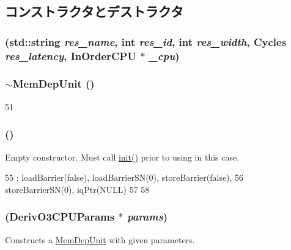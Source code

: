 \subsection{コンストラクタとデストラクタ}
\hypertarget{classMemDepUnit_a954662036e667fd17db64ae83226ff3f}{
\subsubsection[{MemDepUnit}]{ (std::string {\em res\_\-name}, \/  int {\em res\_\-id}, \/  int {\em res\_\-width}, \/  {\bf Cycles} {\em res\_\-latency}, \/  {\bf InOrderCPU} $\ast$ {\em \_\-cpu})}}
\label{classMemDepUnit_a954662036e667fd17db64ae83226ff3f}
\hypertarget{classMemDepUnit_a45331beda5c09d8c776b6bd7c1814b59}{
\subsubsection[{$\sim$MemDepUnit}]{\setlength{\rightskip}{0pt plus 5cm}$\sim${\bf MemDepUnit} ()}}
\label{classMemDepUnit_a45331beda5c09d8c776b6bd7c1814b59}



\begin{DoxyCode}
51 {}
\end{DoxyCode}
\hypertarget{classMemDepUnit_a6a36e6c9f97f9e122c96398a39f53c7e}{
\subsubsection[{MemDepUnit}]{ ()}}
\label{classMemDepUnit_a6a36e6c9f97f9e122c96398a39f53c7e}
Empty constructor. Must call \hyperlink{classResource_a02fd73d861ef2e4aabb38c0c9ff82947}{init()} prior to using in this case. 


\begin{DoxyCode}
55     : loadBarrier(false), loadBarrierSN(0), storeBarrier(false),
56       storeBarrierSN(0), iqPtr(NULL)
57 {
58 }
\end{DoxyCode}
\hypertarget{classMemDepUnit_ad6878b8c69951d1680a6fcc62866a18f}{
\subsubsection[{MemDepUnit}]{ (DerivO3CPUParams $\ast$ {\em params})}}
\label{classMemDepUnit_ad6878b8c69951d1680a6fcc62866a18f}
Constructs a \hyperlink{classMemDepUnit}{MemDepUnit} with given parameters. 


